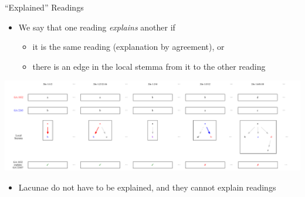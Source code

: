 \documentclass[10pt]{beamer}
\begin{document}
	\begin{frame}{``Explained'' Readings}\label{slide:explained-readings}
		\begin{itemize}
			\item We say that one reading \emph{explains} another if
			\begin{itemize}
				\item it is the same reading (explanation by agreement), or
				\item there is an edge in the local stemma from it to the other reading
			\end{itemize}
		\end{itemize}
		\begin{center}
			\includegraphics[width=\textwidth]{../graphics/explained-readings.pdf}
		\end{center}
		\begin{itemize}
			\item Lacunae do not have to be explained, and they cannot explain readings
		\end{itemize}
	\end{frame}
\end{document}
